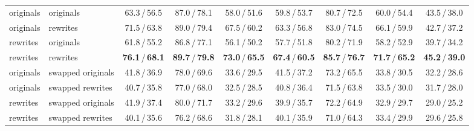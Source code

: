 \begin{table}[t]
\begin{tabular}{@{}llccc@{\hspace{12pt}}cccc@{}}
originals & originals          & 63.3\,/\,56.5 & 87.0\,/\,78.1 & 58.0\,/\,51.6 & 59.8\,/\,53.7 & 80.7\,/\,72.5 & 60.0\,/\,54.4 & 43.5\,/\,38.0 \\
originals & rewrites           & 71.5\,/\,63.8 & 89.0\,/\,79.4 & 67.5\,/\,60.2 & 63.3\,/\,56.8 & 83.0\,/\,74.5 & 66.1\,/\,59.9 & 42.7\,/\,37.2 \\
rewrites  & originals          & 61.8\,/\,55.2 & 86.8\,/\,77.1 & 56.1\,/\,50.2 & 57.7\,/\,51.8 & 80.2\,/\,71.9 & 58.2\,/\,52.9 & 39.7\,/\,34.2 \\
rewrites  & rewrites           & \textbf{76.1}\,/\,\textbf{68.1} & \textbf{89.7}\,/\,\textbf{79.8} & \textbf{73.0}\,/\,\textbf{65.5} & \textbf{67.4}\,/\,\textbf{60.5} & \textbf{85.7}\,/\,\textbf{76.7} & \textbf{71.7}\,/\,\textbf{65.2} & \textbf{45.2}\,/\,\textbf{39.0} \\
originals & swapped originals  & 41.8\,/\,36.9 & 78.0\,/\,69.6 & 33.6\,/\,29.5 & 41.5\,/\,37.2 & 73.2\,/\,65.5 & 33.8\,/\,30.5 & 32.2\,/\,28.6 \\
originals & swapped rewrites   & 40.7\,/\,35.8 & 77.0\,/\,68.0 & 32.5\,/\,28.5 & 40.8\,/\,36.4 & 71.5\,/\,63.8 & 33.5\,/\,30.0 & 31.7\,/\,28.0 \\
rewrites  & swapped originals  & 41.9\,/\,37.4 & 80.0\,/\,71.7 & 33.2\,/\,29.6 & 39.9\,/\,35.7 & 72.2\,/\,64.9 & 32.9\,/\,29.7 & 29.0\,/\,25.2 \\
rewrites  & swapped rewrites   & 40.1\,/\,35.6 & 76.2\,/\,68.6 & 31.8\,/\,28.1 & 40.1\,/\,35.9 & 71.0\,/\,64.3 & 33.4\,/\,29.9 & 29.6\,/\,25.8 \\
\bottomrule
\end{tabular}
\end{table}
